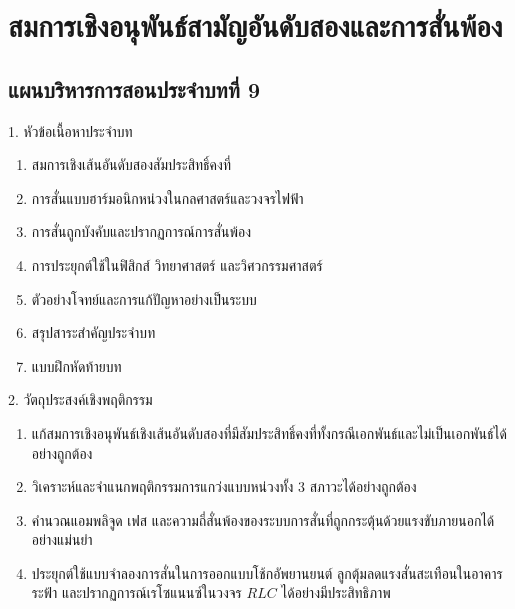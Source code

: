\chapter{สมการเชิงอนุพันธ์สามัญอันดับสองและการสั่นพ้อง}

\section*{แผนบริหารการสอนประจำบทที่ 9}

\begin{planbox}[colframe=rbruNavy, colbacktitle=rbruNavy]{1. หัวข้อเนื้อหาประจำบท}
\begin{enumerate}[topsep=2pt, itemsep=1pt, partopsep=0pt, parsep=0pt, leftmargin=1.5em]
    \item สมการเชิงเส้นอันดับสองสัมประสิทธิ์คงที่
    \item การสั่นแบบฮาร์มอนิกหน่วงในกลศาสตร์และวงจรไฟฟ้า
    \item การสั่นถูกบังคับและปรากฏการณ์การสั่นพ้อง
    \item การประยุกต์ใช้ในฟิสิกส์ วิทยาศาสตร์ และวิศวกรรมศาสตร์
    \item ตัวอย่างโจทย์และการแก้ปัญหาอย่างเป็นระบบ
    \item สรุปสาระสำคัญประจำบท
    \item แบบฝึกหัดท้ายบท
\end{enumerate}
\end{planbox}

\begin{planbox}[colframe=rbruGreen, colbacktitle=rbruGreen]{2. วัตถุประสงค์เชิงพฤติกรรม}
\begin{enumerate}[topsep=2pt, itemsep=1pt, partopsep=0pt, parsep=0pt, leftmargin=1.5em]
    \item แก้สมการเชิงอนุพันธ์เชิงเส้นอันดับสองที่มีสัมประสิทธิ์คงที่ทั้งกรณีเอกพันธ์และไม่เป็นเอกพันธ์ได้อย่างถูกต้อง
    \item วิเคราะห์และจำแนกพฤติกรรมการแกว่งแบบหน่วงทั้ง 3 สภาวะได้อย่างถูกต้อง
    \item คำนวณแอมพลิจูด เฟส และความถี่สั่นพ้องของระบบการสั่นที่ถูกกระตุ้นด้วยแรงขับภายนอกได้อย่างแม่นยำ
    \item ประยุกต์ใช้แบบจำลองการสั่นในการออกแบบโช้กอัพยานยนต์ ลูกตุ้มลดแรงสั่นสะเทือนในอาคารระฟ้า และปรากฏการณ์เรโซแนนซ์ในวงจร $RLC$ ได้อย่างมีประสิทธิภาพ
\end{enumerate}
\end{planbox}

